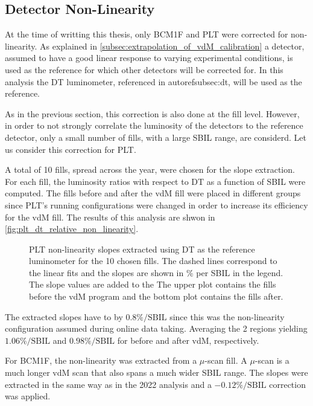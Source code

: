 \subsection{Detector Non-Linearity}
\label{subsec:detector_non_linearity}

At the time of writting this thesis, only BCM1F and PLT were corrected for non-linearity. As explained in \autoref{subsec:extrapolation_of_vdM_calibration} a detector, assumed to have a good linear response to varying experimental conditions, is used as the reference for which other detectors will be corrected for. In this analysis the DT luminometer, referenced in autoref{subsec:dt}, will be used as the reference.

As in the previous section, this correction is also done at the fill level. However, in order to not strongly correlate the luminosity of the detectors to the reference detector, only a small number of fills, with a large SBIL range, are considerd. Let us consider this correction for PLT.

A total of 10 fills, spread across the year, were chosen for the slope extraction. For each fill, the luminosity ratios with respect to DT as a function of SBIL were computed. The fills before and after the vdM fill were placed in different groups since PLT's running configurations were changed in order to increase its efficiency for the vdM fill. The results of this analysis are shwon in \autoref{fig:plt_dt_relative_non_linearity}.

\begin{figure}[!htb]
	\centering
	\caption[PLT relative non-linearity slopes]{PLT non-linearity slopes extracted using DT as the reference luminometer for the 10 chosen fills. The dashed lines correspond to the linear fits and the slopes are shown in \% per SBIL in the legend. The slope values are added to the The upper plot contains the fills before the vdM program and the bottom plot contains the fills after.}
	\label{fig:plt_dt_relative_non_linearity}
\end{figure}

The extracted slopes have to by $0.8\%/\text{SBIL}$ since this was the non-linearity configuration assumed during online data taking. Averaging the 2 regions yielding $1.06\%/\text{SBIL}$ and $0.98\%/\text{SBIL}$ for before and after vdM, respectively. 

For BCM1F, the non-linearity was extracted from a $\mu$-scan fill. A $\mu$-scan is a much longer vdM scan that also spans a much wider SBIL range. The slopes were extracted in the same way as in the 2022 analysis \cite{CMS-PAS-LUM-22-001} and a $-0.12\%/\text{SBIL}$ correction was applied.

